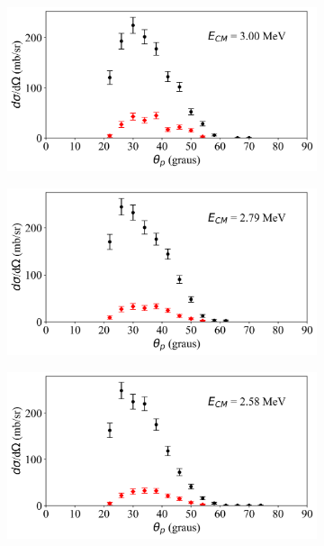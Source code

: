 \documentclass[a4paper,12pt,oneside]{book}
\begin{document}
\begin{figure}[H]
\begin{subfigure}[b]{0.49\textwidth}
        \caption{}
        \label{subfig:dist_ang_o}
    \end{subfigure}%
    \hfill
    \begin{subfigure}[b]{0.48\textwidth}
        \centering
        \includegraphics[scale=0.38, width=1.\columnwidth]{figs/dist_angs/dist_ang_15.png}
        \caption{}
        \label{subfig:dist_ang_p}
    \end{subfigure}
    \begin{subfigure}[b]{0.49\textwidth}
        \centering
        \includegraphics[scale=0.38, width=1.\columnwidth]{figs/dist_angs/dist_ang_16.png}
        \caption{}
        \label{subfig:dist_ang_q}
    \end{subfigure}%
    \hfill
    \begin{subfigure}[b]{0.48\textwidth}
        \centering
        \includegraphics[scale=0.38, width=1.\columnwidth]{figs/dist_angs/dist_ang_17.png}

\end{subfigure}
\end{figure}
\end{document}
